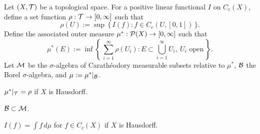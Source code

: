 \documentclass{../note}
\begin{document}
\begin{prb}
Let $(X,\mathcal{T})$ be a topological space.
For a positive linear functional $I$ on $C_c(X)$, define a set function $\rho:\mathcal{T}\to[0,\infty]$ such that
\[\rho(U):=\sup\,\{\,I(f):f\in C_c(U,[0,1])\,\}.\]
Define the associated outer measure $\mu^*:\mathcal{P}(X)\to[0,\infty]$ such that
\[\mu^*(E):=\inf\left\{\,\sum_{i=1}^\infty\rho(U_i):E\subset\bigcup_{i=1}^\infty U_i,\ U_i\text{ open}\,\right\}.\]
Let $\mathcal{M}$ be the $\sigma$-algebra of Carath\'eodory measurable subsets relative to $\mu^*$, $\mathcal{B}$ the Borel $\sigma$-algebra, and $\mu:=\mu^*|_{\mathcal{B}}$.
\begin{parts}
\item $\mu^*|_{\mathcal{T}}=\rho$ if $X$ is Hausdorff.
\item $\mathcal{B}\subset\mathcal{M}$.
\item $I(f)=\int f\,d\mu$ for $f\in C_c(X)$ if $X$ is Hausdorff.
\end{parts}
\end{prb}
\end{document}
